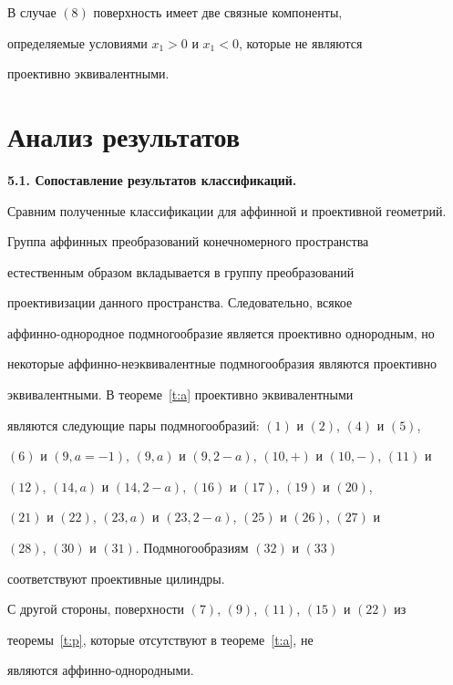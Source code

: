 \begin{note} В случае $(8)$ поверхность имеет две связные компоненты,


определяемые условиями $x_1>0$ и $x_1<0$, которые не являются


проективно эквивалентными. 


\end{note}





\section{Анализ результатов}





{\bf 5.1. Сопоставление результатов классификаций.}


Сравним полученные классификации для аффинной и проективной геометрий.


Группа аффинных преобразований конечномерного пространства


естественным образом вкладывается в группу преобразований


проективизации данного пространства. Следовательно, всякое 


аффинно-однородное подмногообразие является проективно однородным, но


некоторые аффинно-неэквивалентные подмногообразия являются проективно


эквивалентными. В теореме~\ref{t:a} проективно эквивалентными


являются следующие пары подмногообразий: $(1)$ и $(2)$, $(4)$ и $(5)$,


$(6)$ и $(9,a=-1)$, $(9,a)$ и $(9,2-a)$, $(10,+)$ и $(10,-)$, $(11)$ и


$(12)$, $(14,a)$ и $(14,2-a)$, $(16)$ и $(17)$, $(19)$ и $(20)$,


$(21)$ и $(22)$, $(23,a)$ и $(23,2-a)$, $(25)$ и $(26)$, $(27)$ и


$(28)$, $(30)$ и $(31)$. Подмногообразиям $(32)$ и $(33)$


соответствуют проективные цилиндры.





С другой стороны, поверхности $(7)$, $(9)$, $(11)$, $(15)$ и $(22)$ из


теоремы~\ref{t:p}, которые отсутствуют в теореме~\ref{t:a}, не


являются аффинно-однородными. 





